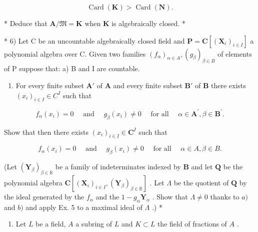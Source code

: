 \[
\operatorname{Card} (\mathbf {K}) > \operatorname{Card} (\mathbf {N}).
\]

* Deduce that \(\mathbf{A} / \mathfrak{M} = \mathbf{K}\) when \(\mathbf{K}\) is algebraically closed. *

* 6) Let C be an uncountable algebraically closed field and \(\mathbf{P} = \mathbf{C}[(\mathbf{X}_i)_{i \in I}]\) a polynomial algebra over C. Given two families \((f_\alpha)_{\alpha \in A}, (g_\beta)_{\beta \in B}\) of elements of P suppose that: a) B and I are countable.

\begin{enumerate}
\def\labelenumi{\alph{enumi})}
\setcounter{enumi}{1}
\tightlist
\item
  For every finite subset \(\mathbf{A}'\) of \(\mathbf{A}\) and every finite subset \(\mathbf{B}'\) of \(\mathbf{B}\) there exists \((x_i)_{i\in I} \in C^I\) such that
\end{enumerate}

\[
f _ {\alpha} (x _ {i}) = 0 \quad \text { and } \quad g _ {\beta} (x _ {i}) \neq 0 \quad \text { for   all } \quad \alpha \in \mathbf {A} ^ {\prime}, \beta \in \mathbf {B} ^ {\prime}.
\]

Show that then there exists \((x_{i})_{i\in I}\in \mathbf{C}^{I}\) such that

\[
f _ {\alpha} (x _ {i}) = 0 \quad \text { and } \quad g _ {\beta} (x _ {i}) \neq 0 \quad \text { for   all } \quad \alpha \in A, \beta \in B.
\]

(Let \((\mathbf{Y}_{\beta})_{\beta \in \mathbb{B}}\) be a family of indeterminates indexed by \(\mathbf{B}\) and let \(\mathbf{Q}\) be the polynomial algebra \(\mathbf{C}[(\mathbf{X}_i)_{i\in I}, (\mathbf{Y}_{\beta})_{\beta \in \mathbb{B}}]\) . Let \(\Lambda\) be the quotient of \(\mathbf{Q}\) by the ideal generated by the \(f_{\alpha}\) and the \(1 - g_{\alpha}\mathbf{Y}_{\alpha}\) . Show that \(\Lambda \neq 0\) thanks to \(a)\) and \(b)\) and apply Ex. 5 to a maximal ideal of \(\Lambda\) .) *

\begin{enumerate}
\def\labelenumi{\arabic{enumi})}
\setcounter{enumi}{6}
\tightlist
\item
  Let \(L\) be a field, \(A\) a subring of \(L\) and \(K \subset L\) the field of fractions of \(A\) .
\end{enumerate}

